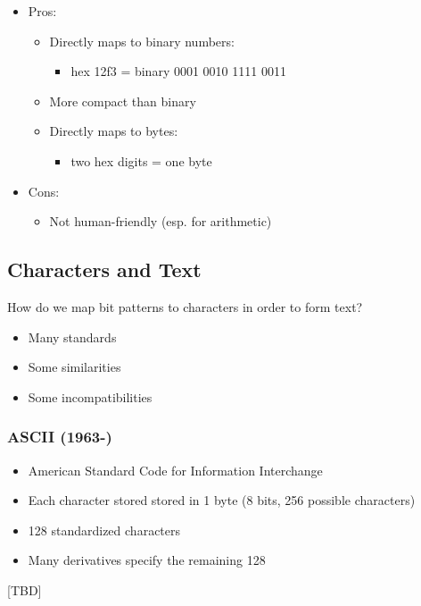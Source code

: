 \documentclass[12pt]{article}
\begin{document}
\begin{itemize}
    \item Pros:
    \begin{itemize}
        \item Directly maps to binary numbers:
        \begin{itemize}
            \item hex 12f3 = binary 0001 0010 1111 0011
        \end{itemize}
        \item More compact than binary
        \item Directly maps to bytes:
        \begin{itemize}
            \item two hex digits = one byte
        \end{itemize}
    \end{itemize}
    \item Cons:
    \begin{itemize}
        \item Not human-friendly (esp. for arithmetic)
    \end{itemize}
\end{itemize}
\subsection{Characters and Text}

How do we map bit patterns to characters in order to form text?

\begin{itemize}
    \item Many standards
    \item Some similarities
    \item Some incompatibilities
\end{itemize}

\subsubsection{ASCII (1963-)}
\begin{itemize}
    \item American Standard Code for Information Interchange
    \item Each character stored stored in 1 byte (8 bits, 256 possible characters)
    \item 128 standardized characters
    \item Many derivatives specify the remaining 128
\end{itemize}
[TBD] %
\end{document}
